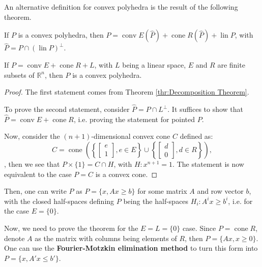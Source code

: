 An alternative definition for convex polyhedra is the result of the following
theorem.

\begin{theorem}
\label{thr:Alternative definition of convex polyhedra}
  If \( P \) is a convex polyhedra, then \( P = \operatorname{conv} E(\hat{P}) +
  \operatorname{cone} R(\hat{P}) + \operatorname{lin} P\), with \( \hat{P} = P
  \cap (\operatorname{lin} P)^{\perp } \).

  If \( P = \operatorname{conv} E + \operatorname{cone} R + L \), with \( L \)
  being a linear space, \( E \) and \( R \) are finite subsets of \(
  \mathbb{R}^{n} \), then \( P \) is a convex polyhedra.
\end{theorem}

\begin{proof}
  The first statement comes from Theorem \ref{thr:Decomposition Theorem}.

  To prove the second statement, consider \( \hat{P} = P \cap L^{\perp } \). It
  suffices to show that \( \hat{P} = \operatorname{conv} E + \operatorname{cone}
  R\), i.e. proving the statement for pointed \( P \).

  Now, consider the \( (n+1) \)-dimensional convex cone \( C \) defined as:
  \[
    C = \operatorname{cone} \left( \left\{ \begin{bmatrix} e \\ 1 \end{bmatrix},
    e \in E\right\} \cup \left\{ \begin{bmatrix} d \\ 0 \end{bmatrix}, d \in R \right\}  \right)   
  ,\], then we see that \( P \times \{1\} = C \cap H   \), with \( H: x^{n+1} =
  1\). The statement is now equivalent to the case \( P = C \) is a convex cone.
\end{proof}


Then, one can write \( P \) as \( P = \{x, Ax \ge  b\}   \) for some matrix \( A
\) and row vector \( b \), with the closed half-spaces defining \( P \) being
the half-spaces \( H_{i}: A^{i}x \ge  b^{i} \), i.e. for the case \( E = \{0\}
\).

Now, we need to prove the theorem for the \( E = L = \{0\}    \) case. Since \(
P = \operatorname{cone} R\), denote \( A \) as the matrix with columns being
elements of \( R \), then \( P = \{ Ax, x \ge  0\}   \). One can use
the \textbf{Fourier-Motzkin elimination method} to turn this form into \( P = \{x,
A'x \le b'\}   \).

